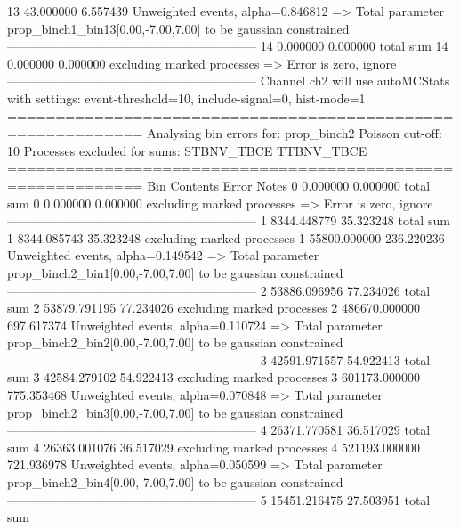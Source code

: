 13         43.000000       6.557439        Unweighted events, alpha=0.846812
  => Total parameter prop_binch1_bin13[0.00,-7.00,7.00] to be gaussian constrained
------------------------------------------------------------
14         0.000000        0.000000        total sum                     
14         0.000000        0.000000        excluding marked processes    
  => Error is zero, ignore      
------------------------------------------------------------
Channel ch2 will use autoMCStats with settings: event-threshold=10, include-signal=0, hist-mode=1
============================================================
Analysing bin errors for: prop_binch2
Poisson cut-off: 10
Processes excluded for sums: STBNV_TBCE TTBNV_TBCE
============================================================
Bin        Contents        Error           Notes                         
0          0.000000        0.000000        total sum                     
0          0.000000        0.000000        excluding marked processes    
  => Error is zero, ignore      
------------------------------------------------------------
1          8344.448779     35.323248       total sum                     
1          8344.085743     35.323248       excluding marked processes    
1          55800.000000    236.220236      Unweighted events, alpha=0.149542
  => Total parameter prop_binch2_bin1[0.00,-7.00,7.00] to be gaussian constrained
------------------------------------------------------------
2          53886.096956    77.234026       total sum                     
2          53879.791195    77.234026       excluding marked processes    
2          486670.000000   697.617374      Unweighted events, alpha=0.110724
  => Total parameter prop_binch2_bin2[0.00,-7.00,7.00] to be gaussian constrained
------------------------------------------------------------
3          42591.971557    54.922413       total sum                     
3          42584.279102    54.922413       excluding marked processes    
3          601173.000000   775.353468      Unweighted events, alpha=0.070848
  => Total parameter prop_binch2_bin3[0.00,-7.00,7.00] to be gaussian constrained
------------------------------------------------------------
4          26371.770581    36.517029       total sum                     
4          26363.001076    36.517029       excluding marked processes    
4          521193.000000   721.936978      Unweighted events, alpha=0.050599
  => Total parameter prop_binch2_bin4[0.00,-7.00,7.00] to be gaussian constrained
------------------------------------------------------------
5          15451.216475    27.503951       total sum                     
